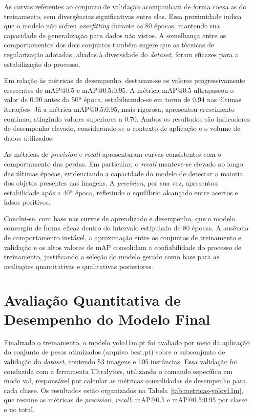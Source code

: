 As curvas referentes ao conjunto de validação acompanham de forma coesa as do treinamento, sem divergências significativas entre elas. Essa proximidade indica que o modelo não sofreu \textit{overfitting} durante as 80 épocas, mantendo sua capacidade de generalização para dados não vistos. A semelhança entre os comportamentos dos dois conjuntos também sugere que as técnicas de regularização adotadas, aliadas à diversidade do \textit{dataset}, foram eficazes para a estabilização do processo.

Em relação às métricas de desempenho, destacam-se os valores progressivamente crescentes de mAP@0.5 e mAP@0.5:0.95. A métrica mAP@0.5 ultrapassou o valor de 0.90 antes da 50ª época, estabilizando-se em torno de 0.94 nas últimas iterações. Já a métrica mAP@0.5:0.95, mais rigorosa, apresentou crescimento contínuo, atingindo valores superiores a 0.70. Ambos os resultados são indicadores de desempenho elevado, considerando-se o contexto de aplicação e o volume de dados utilizados.

As métricas de \textit{precision} e \textit{recall} apresentaram curvas consistentes com o comportamento das perdas. Em particular, o \textit{recall} manteve-se elevado ao longo das últimas épocas, evidenciando a capacidade do modelo de detectar a maioria dos objetos presentes nas imagens. A \textit{precision}, por sua vez, apresentou estabilidade após a 40ª época, refletindo o equilíbrio alcançado entre acertos e falsos positivos.

Conclui-se, com base nas curvas de aprendizado e desempenho, que o modelo convergiu de forma eficaz dentro do intervalo estipulado de 80 épocas. A ausência de comportamento instável, a aproximação entre os conjuntos de treinamento e validação e os altos valores de mAP consolidam a confiabilidade do processo de treinamento, justificando a seleção do modelo gerado como base para as avaliações quantitativas e qualitativas posteriores.

\section{Avaliação Quantitativa de Desempenho do Modelo Final}

Finalizado o treinamento, o modelo yolo11m.pt foi avaliado por meio da aplicação do conjunto de pesos otimizados (arquivo best.pt) sobre o subconjunto de validação do \textit{dataset}, contendo 53 imagens e 105 instâncias. Essa validação foi conduzida com a ferramenta Ultralytics, utilizando o comando específico em modo val, responsável por calcular as métricas consolidadas de desempenho para cada classe. Os resultados estão organizados na Tabela \ref{tab:metricas-yolov11m}, que resume as métricas de \textit{precision}, \textit{recall}, mAP@0.5 e mAP@0.5:0.95 por classe e no total.


